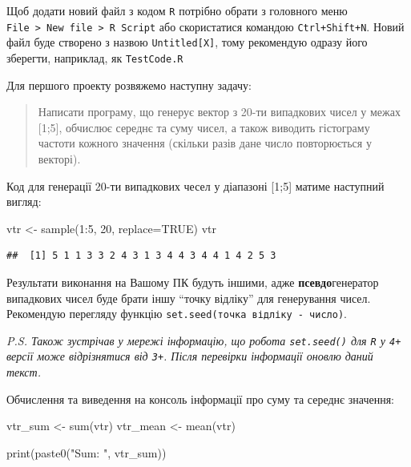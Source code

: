 \documentclass[
]{book}
\newenvironment{Shaded}{\begin{snugshade}}{\end{snugshade}}
\newcommand{\AttributeTok}[1]{\textcolor[rgb]{0.77,0.63,0.00}{#1}}
\newcommand{\ConstantTok}[1]{\textcolor[rgb]{0.00,0.00,0.00}{#1}}
\newcommand{\DecValTok}[1]{\textcolor[rgb]{0.00,0.00,0.81}{#1}}
\newcommand{\FunctionTok}[1]{\textcolor[rgb]{0.00,0.00,0.00}{#1}}
\newcommand{\NormalTok}[1]{#1}
\newcommand{\OtherTok}[1]{\textcolor[rgb]{0.56,0.35,0.01}{#1}}
\newcommand{\SpecialCharTok}[1]{\textcolor[rgb]{0.00,0.00,0.00}{#1}}
\newcommand{\StringTok}[1]{\textcolor[rgb]{0.31,0.60,0.02}{#1}}
\begin{document}
Щоб додати новий файл з кодом \texttt{R} потрібно обрати з головного меню \texttt{File\ \textgreater{}\ New\ file\ \textgreater{}\ R\ Script} або скористатися командою \texttt{Ctrl+Shift+N}. Новий файл буде створено з назвою \texttt{Untitled{[}X{]}}, тому рекомендую одразу його зберегти, наприклад, як \texttt{TestCode.R}

Для першого проекту розвяжемо наступну задачу:

\begin{quote}
Написати програму, що генерує вектор з 20-ти випадкових чисел у межах {[}1;5{]}, обчислює середнє та суму чисел, а також виводить гістограму частоти кожного значення (скільки разів дане число повторюється у векторі).
\end{quote}

Код для генерації 20-ти випадкових чесел у діапазоні {[}1;5{]} матиме наступний вигляд:

\begin{Shaded}
\begin{Highlighting}[]
\NormalTok{vtr }\OtherTok{\textless{}{-}} \FunctionTok{sample}\NormalTok{(}\DecValTok{1}\SpecialCharTok{:}\DecValTok{5}\NormalTok{, }\DecValTok{20}\NormalTok{, }\AttributeTok{replace=}\ConstantTok{TRUE}\NormalTok{)}
\NormalTok{vtr}
\end{Highlighting}
\end{Shaded}

\begin{verbatim}
##  [1] 5 1 1 3 3 2 4 3 1 3 4 4 3 4 4 1 4 2 5 3
\end{verbatim}

Результати виконання на Вашому ПК будуть іншими, адже \textbf{псевдо}генератор випадкових чисел буде брати іншу ``точку відліку'' для генерування чисел. Рекомендую перегляду функцію \texttt{set.seed(точка\ відліку\ -\ число)}.

\emph{P.S. Також зустрічав у мережі інформацію, що робота \texttt{set.seed()} для \texttt{R} у \texttt{4+} версії може відрізнятися від \texttt{3+}. Після перевірки інформації оновлю даний текст.}

Обчислення та виведення на консоль інформації про суму та середнє значення:

\begin{Shaded}
\begin{Highlighting}[]
\NormalTok{vtr\_sum }\OtherTok{\textless{}{-}} \FunctionTok{sum}\NormalTok{(vtr)}
\NormalTok{vtr\_mean }\OtherTok{\textless{}{-}} \FunctionTok{mean}\NormalTok{(vtr)}

\FunctionTok{print}\NormalTok{(}\FunctionTok{paste0}\NormalTok{(}\StringTok{"Sum: "}\NormalTok{, vtr\_sum))}
\end{Highlighting}
\end{Shaded}
\end{document}
